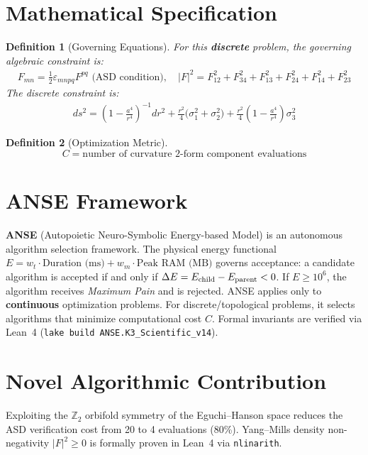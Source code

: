 \documentclass[11pt,a4paper]{article}
\newtheorem{definition}{Definition}
\begin{document}
\section{Mathematical Specification}
\begin{definition}[Governing Equations]
For this \textbf{discrete} problem, the governing algebraic constraint is:
\begin{align}
F_{mn} = \tfrac{1}{2} \varepsilon_{mnpq} F^{pq} \text{ (ASD condition)}, \quad |F|^2 = F_{12}^2 + F_{34}^2 + F_{13}^2 + F_{24}^2 + F_{14}^2 + F_{23}^2
\end{align}
The discrete constraint is:
\begin{align}
ds^2 = \left(1 - \tfrac{a^4}{r^4}\right)^{-1} dr^2 + \tfrac{r^2}{4}\bigl(\sigma_1^2 + \sigma_2^2\bigr) + \tfrac{r^2}{4}\!\left(1 - \tfrac{a^4}{r^4}\right)\sigma_3^2
\end{align}
\end{definition}

\begin{definition}[Optimization Metric]
\[
C = \text{number of curvature 2-form component evaluations}
\]
\end{definition}

\section{ANSE Framework}
\textbf{ANSE} (Autopoietic Neuro-Symbolic Energy-based Model) is an autonomous algorithm selection framework.
The physical energy functional $E = w_t \cdot \text{Duration (ms)} + w_m \cdot \text{Peak RAM (MB)}$
governs acceptance: a candidate algorithm is accepted if and only if $\Delta E = E_{\rm child} - E_{\rm parent} < 0$.
If $E \ge 10^6$, the algorithm receives \emph{Maximum Pain} and is rejected.
ANSE applies only to \textbf{continuous} optimization problems.
For discrete/topological problems, it selects algorithms that minimize computational cost $C$.
Formal invariants are verified via Lean~4 (\texttt{lake build ANSE.K3\_Scientific\_v14}).

\section{Novel Algorithmic Contribution}
Exploiting the $\mathbb{Z}_2$ orbifold symmetry of the Eguchi--Hanson space reduces the ASD verification cost from 20 to 4 evaluations (80\%). Yang--Mills density non-negativity $|F|^2 \ge 0$ is formally proven in Lean~4 via \texttt{nlinarith}.
\end{document}
